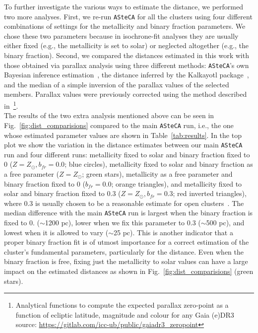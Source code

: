 \documentclass[draft]{aa}
\begin{document}
  To further investigate the various ways to estimate the distance, we performed
  two more analyses. First, we re-run \texttt{ASteCA} for all the
  clusters using four different combinations of settings for the metallicity and
  binary fraction parameters. We chose these two parameters because in
  isochrone-fit analyses they are usually either fixed (e.g., the metallicity is
  set to solar) or neglected altogether (e.g., the binary fraction).
  Second, we compared the distances estimated in this work with those obtained
  via parallax analysis using three different methods: \texttt{ASteCA}'s own
  Bayesian inference estimation~\citep[described in][]{Perren_2020}, the
  distance inferred by the Kalkayotl package~\citep{Kalkayotl}, and the median
  of a simple inversion of the parallax values of the selected members.
  Parallax values were previously corrected using the method described
  in~\cite{Lindegren_2021}\footnote{ Analytical functions to compute the
  expected parallax zero-point as a function of ecliptic latitude, magnitude and
  colour for any Gaia (e)DR3
  source: \url{https://gitlab.com/icc-ub/public/gaiadr3_zeropoint}}.\\

  The results of the two extra analysis mentioned above can be seen in
  Fig.~\ref{fig:dist_comparisions} compared to the main \texttt{ASteCA} run,
  i.e., the one whose estimated parameter values are shown in
  Table~\ref{tab:results}.
  In the top plot we show the variation in the distance estimates between our
  main \texttt{ASteCA} run and four different runs: metallicity fixed to solar
  and binary fraction fixed to 0 ($Z=Z_{\odot},b_{fr}=0.0$; blue circles),
  metallicity fixed to solar and binary fraction as a free parameter
  ($Z=Z_{\odot}$; green stars), metallicity as a free parameter and binary
  fraction fixed to 0 ($b_{fr}=0.0$; orange triangles), and metallicity fixed to
  solar and binary fraction fixed to 0.3 ($Z=Z_{\odot},b_{fr}=0.3$; red
  inverted triangles), where 0.3 is usually chosen to be a reasonable estimate
  for open clusters~\citep{Sollima_2010}. The median difference with the main
  \texttt{ASteCA} run is largest when the binary fraction is fixed to 0. 
  ($\sim$1200 pc), lower when we fix this parameter to 0.3 ($\sim$500 pc),
  and lowest when it is allowed to vary ($\sim$25 pc). This is another indicator
  that a proper binary fraction fit is of utmost importance for a correct
  estimation of the cluster's fundamental parameters, particularly for the
  distance. Even when the binary fraction is free, fixing just the metallicity
  to solar values can have a large impact on the estimated distances as shown in
  Fig.~\ref{fig:dist_comparisions} (green stars).
\end{document}
